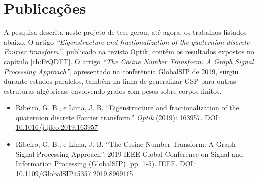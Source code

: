\section{Publica\c c\~oes}

A pesquisa descrita neste projeto de tese gerou, at\'e agora, os trabalhos listados abaixo. O artigo \emph{``Eigenstructure and fractionalization of the quaternion discrete Fourier transform''}, publicado na revista Optik, cont\'em os resultados expostos no cap\'itulo \ref{ch:FrQDFT}. O artigo \emph{``The Cosine Number Transform: A Graph Signal Processing Approach''}, apresentado na confer\^encia GlobalSIP de 2019, surgiu durante estudos paralelos, tamb\'em na linha de generalizar GSP para outras estruturas alg\'ebricas, envolvendo grafos com pesos sobre corpos finitos.

\begin{itemize}
\item Ribeiro, G. B., e Lima, J. B. ``Eigenstructure and fractionalization of the quaternion discrete Fourier transform.'' \emph{Optik} (2019): 163957. DOI: \href{https://doi.org/10.1016/j.ijleo.2019.163957}{10.1016/j.ijleo.2019.163957}

\item Ribeiro, G. B., e Lima, J. B. ``The Cosine Number Transform: A Graph Signal Processing Approach''. 2019 IEEE Global Conference on Signal and Information Processing (GlobalSIP) (pp. 1-5). IEEE. DOI: \href{https://doi.org/10.1109/GlobalSIP45357.2019.8969165}{10.1109/GlobalSIP45357.2019.8969165}
\end{itemize}